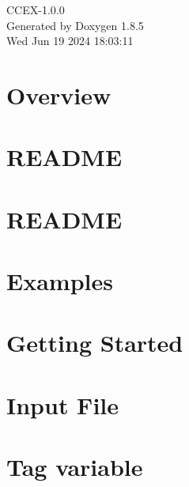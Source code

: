\documentclass[twoside]{book}
\newcommand{\clearemptydoublepage}{%
  \newpage{\pagestyle{empty}\cleardoublepage}%
}
\begin{document}
\hypersetup{pageanchor=false}
\begin{titlepage}
\vspace*{7cm}
\begin{center}%
{\Large C\-C\-E\-X-\/1.0.0 }\\
\vspace*{1cm}
{\large Generated by Doxygen 1.8.5}\\
\vspace*{0.5cm}
{\small Wed Jun 19 2024 18:03:11}\\
\end{center}
\end{titlepage}
\clearemptydoublepage
\tableofcontents
\clearemptydoublepage
{}
\hypersetup{pageanchor=true}

\chapter{Overview}
\label{index}\hypertarget{index}{}
\chapter{R\-E\-A\-D\-M\-E}
\label{md__home_huijin_git_CCEX_README}
\hypertarget{md__home_huijin_git_CCEX_README}{}

\chapter{R\-E\-A\-D\-M\-E}
\label{README}
\hypertarget{README}{}

\chapter{Examples}
\label{Examples}
\hypertarget{Examples}{}

\chapter{Getting Started}
\label{GettingStarted}
\hypertarget{GettingStarted}{}

\chapter{Input File}
\label{InputFile}
\hypertarget{InputFile}{}

\chapter{Tag variable}
\label{TagVariable}
\hypertarget{TagVariable}{}

\end{document}
